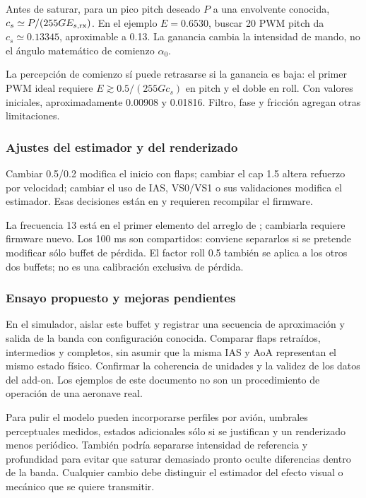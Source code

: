 \documentclass[11pt,a4paper]{article}
\newcommand{\code}[1]{\texttt{\detokenize{#1}}}
\begin{document}
Antes de saturar, para un pico pitch deseado $P$ a una envolvente conocida, $c_s\simeq P/(255GE_{s,\rm rx})$. En el ejemplo $E=0.6530$, buscar 20 PWM pitch da $c_s\simeq0.13345$, aproximable a 0.13. La ganancia cambia la intensidad de mando, no el ángulo matemático de comienzo $\alpha_0$.

La percepción de comienzo sí puede retrasarse si la ganancia es baja: el primer PWM ideal requiere $E\gtrsim0.5/(255Gc_s)$ en pitch y el doble en roll. Con valores iniciales, aproximadamente 0.00908 y 0.01816. Filtro, fase y fricción agregan otras limitaciones.

\subsubsection{Ajustes del estimador y del renderizado}
Cambiar 0.5/0.2 modifica el inicio con flaps; cambiar el cap 1.5 altera refuerzo por velocidad; cambiar el uso de IAS, VS0/VS1 o sus validaciones modifica el estimador. Esas decisiones están en \code{BuffetModel.h} y requieren recompilar el firmware.

La frecuencia 13 está en el primer elemento del arreglo de \code{SimEffects.h}; cambiarla requiere firmware nuevo. Los 100 ms son compartidos: conviene separarlos si se pretende modificar sólo buffet de pérdida. El factor roll 0.5 también se aplica a los otros dos buffets; no es una calibración exclusiva de pérdida.

\subsubsection{Ensayo propuesto y mejoras pendientes}
En el simulador, aislar este buffet y registrar una secuencia de aproximación y salida de la banda con configuración conocida. Comparar flaps retraídos, intermedios y completos, sin asumir que la misma IAS y AoA representan el mismo estado físico. Confirmar la coherencia de unidades y la validez de los datos del add-on. Los ejemplos de este documento no son un procedimiento de operación de una aeronave real.

Para pulir el modelo pueden incorporarse perfiles por avión, umbrales perceptuales medidos, estados adicionales sólo si se justifican y un renderizado menos periódico. También podría separarse intensidad de referencia y profundidad para evitar que saturar demasiado pronto oculte diferencias dentro de la banda. Cualquier cambio debe distinguir el estimador del efecto visual o mecánico que se quiere transmitir.
\end{document}
